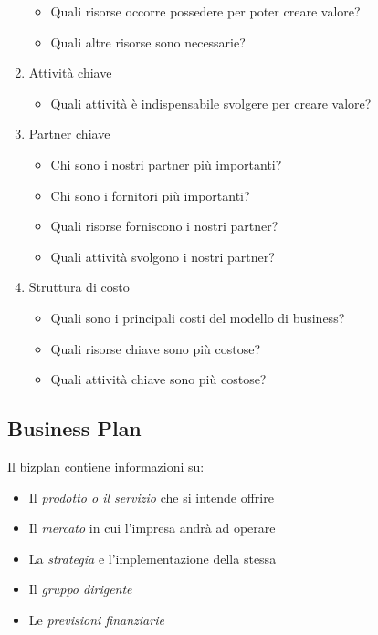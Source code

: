 \documentclass[10pt,a4paper,fleqn,oneside]{book}
\begin{document}
\begin{enumerate}
\begin{itemize}
        \item Quali risorse occorre possedere per poter creare valore? 
        \item Quali altre risorse sono necessarie?
    \end{itemize}
    \item Attività chiave
    \begin{itemize}
        \item Quali attività è indispensabile svolgere per creare valore?
    \end{itemize}
    \item Partner chiave
    \begin{itemize}
        \item Chi sono i nostri partner più importanti?
        \item Chi sono i fornitori più importanti?
        \item Quali risorse forniscono i nostri partner? 
        \item Quali attività svolgono i nostri partner?
    \end{itemize}
    \item Struttura di costo
    \begin{itemize}
        \item Quali sono i principali costi del modello
        di business?
        \item Quali risorse chiave sono più costose?
        \item Quali attività chiave sono più costose?
    \end{itemize}
\end{enumerate}

\subsection{Business Plan}

Il \gls{bizplan} contiene informazioni su:
\begin{itemize}
    \item Il \emph{prodotto o il servizio} che si intende offrire
    \item Il \emph{mercato} in cui l’impresa andrà ad operare
    \item La \emph{strategia} e l’implementazione della stessa
    \item Il \emph{gruppo dirigente}
    \item Le \emph{previsioni finanziarie}
\end{itemize}
\end{document}
